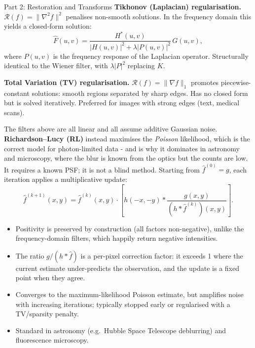 \documentclass[letterpaper]{article}
\begin{document}
\begin{notes}{Part 2: Restoration and Transforms}
\textbf{Tikhonov (Laplacian) regularisation.} $\mathcal{R}(f) = \|\nabla^2 f\|^2$ penalises non-smooth solutions. In the frequency domain this yields a closed-form solution:
$$\hat{F}(u,v) = \frac{H^*(u,v)}{|H(u,v)|^2 + \lambda|P(u,v)|^2}\,G(u,v),$$
where $P(u,v)$ is the frequency response of the Laplacian operator. Structurally identical to the Wiener filter, with $\lambda|P|^2$ replacing $K$.

\textbf{Total Variation (TV) regularisation.} $\mathcal{R}(f) = \|\nabla f\|_1$ promotes piecewise-constant solutions: smooth regions separated by sharp edges. Has no closed form but is solved iteratively. Preferred for images with strong edges (text, medical scans).


The filters above are all linear and all assume additive Gaussian noise. \textbf{Richardson--Lucy (RL)} instead maximises the \emph{Poisson} likelihood, which is the correct model for photon-limited data - and is why it dominates in astronomy and microscopy, where the blur is known from the optics but the counts are low. It requires a known PSF; it is not a blind method. Starting from $\hat{f}^{(0)}=g$, each iteration applies a multiplicative update:
$$\hat{f}^{(k+1)}(x,y) = \hat{f}^{(k)}(x,y)\cdot\left[h(-x,-y)*\frac{g(x,y)}{(h*\hat{f}^{(k)})(x,y)}\right].$$
\begin{itemize}[noitemsep,topsep=2pt]
    \item Positivity is preserved by construction (all factors non-negative), unlike the frequency-domain filters, which happily return negative intensities.
    \item The ratio $g/(h*\hat f)$ is a per-pixel correction factor: it exceeds 1 where the current estimate under-predicts the observation, and the update is a fixed point when they agree.
    \item Converges to the maximum-likelihood Poisson estimate, but amplifies noise with increasing iterations; typically stopped early or regularised with a TV/sparsity penalty.
    \item Standard in astronomy (e.g.\ Hubble Space Telescope deblurring) and fluorescence microscopy.
\end{itemize}



\end{notes}
\end{document}

